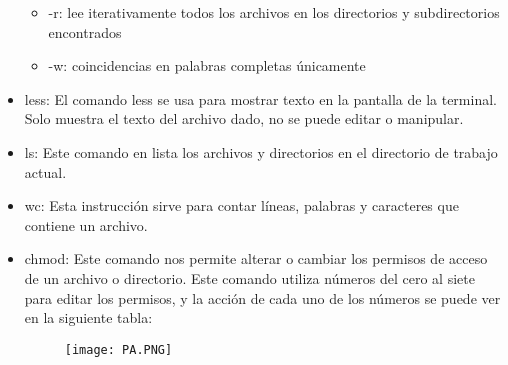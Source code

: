 \documentclass{article}
\begin{document}
\begin{itemize}
\begin{itemize}
    \item -r: lee iterativamente todos los archivos en los directorios y subdirectorios encontrados
    \item -w: coincidencias en palabras completas únicamente
    \end{itemize}
\item less: El comando less se usa para mostrar texto en la pantalla de la terminal. Solo muestra el texto del archivo dado, no se puede editar o manipular.
\item ls: Este comando en lista los archivos y directorios en el directorio de trabajo actual.
\item wc: Esta instrucción sirve para contar líneas, palabras y caracteres que contiene un archivo.

\item chmod: Este comando nos permite alterar o cambiar los permisos de acceso de un archivo o directorio. Este comando utiliza números del cero al siete para editar los permisos, y la acción de cada uno de los números se puede ver en la siguiente tabla:
\begin{figure}[htb]
    \begin{center}
    \texttt{[image: PA.PNG]}
    \end{center}
    \end{figure}

\end{itemize}
\end{document}
